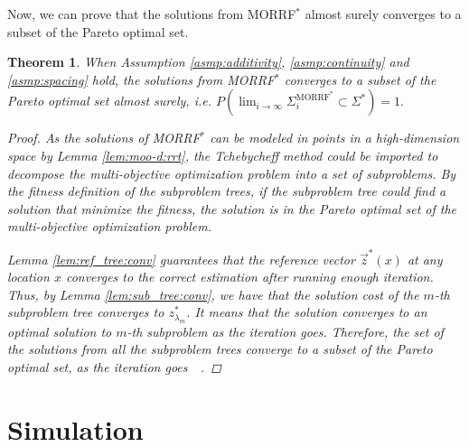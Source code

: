 \documentclass{article}
\newtheorem{thm}{Theorem}
\begin{document}
Now, we can prove that the solutions from MORRF$^{*}$ almost surely converges to a subset of the Pareto optimal set.

\begin{thm}
\label{thm:morrt:conv}
When Assumption \ref{asmp:additivity}, \ref{asmp:continuity} and \ref{asmp:spacing} hold,
the solutions from MORRF$^{*} $ converges to a subset of the Pareto optimal set almost surely, i.e.
$
P( \lim_{ i \rightarrow \infty }  \Sigma^{\mbox{MORRF}^{*}}_{i}  \subset \Sigma^{*} ) = 1.
$
\begin{proof}
As the solutions of MORRF$^{*}$ can be modeled in points in a high-dimension space by Lemma \ref{lem:moo-d:rrt}, the Tchebycheff method could be imported to decompose the multi-objective optimization problem into a set of subproblems.
By the fitness definition of the subproblem trees, if the subproblem tree could find a solution that minimize the fitness, the solution is in the Pareto optimal set of the multi-objective optimization problem.

Lemma \ref{lem:ref_tree:conv} guarantees that the reference vector $ \vec{z}^{*}(x) $ at any location $ x $ converges to the correct estimation after running enough iteration.
Thus, by Lemma \ref{lem:sub_tree:conv}, we have that the solution cost of the $ m $-th subproblem tree converges to $ z^{*}_{ \lambda_{m} } $.
It means that the solution converges to an optimal solution to $ m $-th subproblem as the iteration goes.
Therefore, the set of the solutions from all the subproblem trees converge to a subset of the Pareto optimal set, as the iteration goes~\cite{4358754}~\cite{miettinen1999nonlinear}.
\end{proof}
\end{thm}

\section{Simulation}
\label{sec:simulation}

\end{document}
